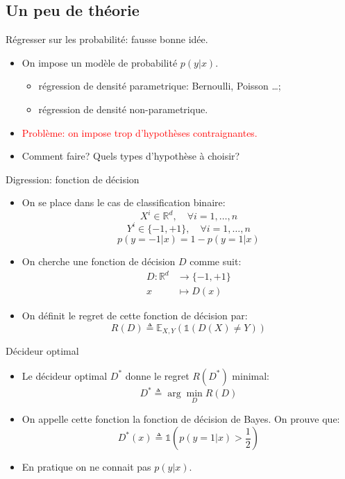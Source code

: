 \documentclass[8pt]{beamer}
\begin{document}
	\subsection{Un peu de théorie}
		\begin{frame}{Régresser sur les probabilité: fausse bonne idée.}
			\begin{itemize}
				\item<1-> On impose un modèle de probabilité $p(y\vert x)$.
					\begin{itemize}
						\item régression de densité parametrique: Bernoulli, Poisson \dots;
						\item régression de densité non-parametrique.
					\end{itemize}
				\item<2-> \textcolor{red}{Problème: on impose trop d'hypothèses contraignantes.}
				\item<3-> Comment faire? Quels types d'hypothèse à choisir?
			\end{itemize}
		\end{frame}
		\begin{frame}{Digression: fonction de décision}
			\begin{itemize}
				\item<1-> On se place dans le cas de classification binaire:
					$$ X^i \in \mathbb{R}^d , \quad \forall i=1,\dots,n$$
					$$ Y^i \in \{-1, +1\} , \quad \forall i=1,\dots,n$$
					$$p(y = -1 \vert x) = 1 - p(y = 1 \vert x)$$
				\item<2-> On cherche une fonction de décision $D$ comme suit:
				\begin{align*}
					D: \mathbb{R}^d &\rightarrow \{-1, +1\} \\
					x &\mapsto D(x)
				\end{align*}
				\item<3-> On définit le regret de cette fonction de décision par:
				\begin{equation}
					R(D) \triangleq \mathbb{E}_{X,Y}(\mathbb{1}(D(X)\neq Y))
				\end{equation}
			\end{itemize}
		\end{frame}
		\begin{frame}{Décideur optimal}
			\begin{itemize}
				\item<1-> Le décideur optimal $D^*$ donne le regret $R(D^*)$ minimal:
					  \begin{equation}
						  D^* \triangleq \arg \min_{D} R(D) 
					  \end{equation}
				\item<2-> On appelle cette fonction la fonction de décision de Bayes. On prouve que:
					  \begin{equation}
						D^*(x) \triangleq \mathbb{1}(p(y = 1 \vert x)> \frac{1}{2})
					  \end{equation}
				\item<3-> En pratique on ne connait pas $p(y\vert x)$.
			\end{itemize}
		\end{frame}
\end{document}
